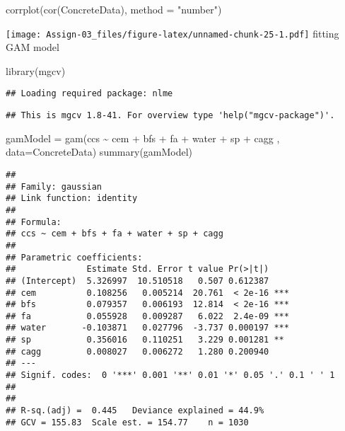 \documentclass[
]{article}
\newenvironment{Shaded}{\begin{snugshade}}{\end{snugshade}}
\newcommand{\AttributeTok}[1]{\textcolor[rgb]{0.77,0.63,0.00}{#1}}
\newcommand{\FunctionTok}[1]{\textcolor[rgb]{0.00,0.00,0.00}{#1}}
\newcommand{\NormalTok}[1]{#1}
\newcommand{\OtherTok}[1]{\textcolor[rgb]{0.56,0.35,0.01}{#1}}
\newcommand{\SpecialCharTok}[1]{\textcolor[rgb]{0.00,0.00,0.00}{#1}}
\newcommand{\StringTok}[1]{\textcolor[rgb]{0.31,0.60,0.02}{#1}}
\begin{document}
\begin{Shaded}
\begin{Highlighting}[]
\FunctionTok{corrplot}\NormalTok{(}\FunctionTok{cor}\NormalTok{(ConcreteData), }\AttributeTok{method =} \StringTok{"number"}\NormalTok{)}
\end{Highlighting}
\end{Shaded}

\texttt{[image: Assign-03\_files/figure-latex/unnamed-chunk-25-1.pdf]}
fitting GAM model

\begin{Shaded}
\begin{Highlighting}[]
\FunctionTok{library}\NormalTok{(mgcv)}
\end{Highlighting}
\end{Shaded}

\begin{verbatim}
## Loading required package: nlme
\end{verbatim}

\begin{verbatim}
## This is mgcv 1.8-41. For overview type 'help("mgcv-package")'.
\end{verbatim}

\begin{Shaded}
\begin{Highlighting}[]
\NormalTok{gamModel }\OtherTok{=} \FunctionTok{gam}\NormalTok{(ccs }\SpecialCharTok{\textasciitilde{}}\NormalTok{ cem }\SpecialCharTok{+}\NormalTok{ bfs }\SpecialCharTok{+}\NormalTok{ fa }\SpecialCharTok{+}\NormalTok{ water }\SpecialCharTok{+}\NormalTok{ sp }\SpecialCharTok{+}\NormalTok{ cagg , }\AttributeTok{data=}\NormalTok{ConcreteData)}
\FunctionTok{summary}\NormalTok{(gamModel)}
\end{Highlighting}
\end{Shaded}

\begin{verbatim}
## 
## Family: gaussian 
## Link function: identity 
## 
## Formula:
## ccs ~ cem + bfs + fa + water + sp + cagg
## 
## Parametric coefficients:
##              Estimate Std. Error t value Pr(>|t|)    
## (Intercept)  5.326997  10.510518   0.507 0.612387    
## cem          0.108256   0.005214  20.761  < 2e-16 ***
## bfs          0.079357   0.006193  12.814  < 2e-16 ***
## fa           0.055928   0.009287   6.022  2.4e-09 ***
## water       -0.103871   0.027796  -3.737 0.000197 ***
## sp           0.356016   0.110251   3.229 0.001281 ** 
## cagg         0.008027   0.006272   1.280 0.200940    
## ---
## Signif. codes:  0 '***' 0.001 '**' 0.01 '*' 0.05 '.' 0.1 ' ' 1
## 
## 
## R-sq.(adj) =  0.445   Deviance explained = 44.9%
## GCV = 155.83  Scale est. = 154.77    n = 1030
\end{verbatim}
\end{document}
